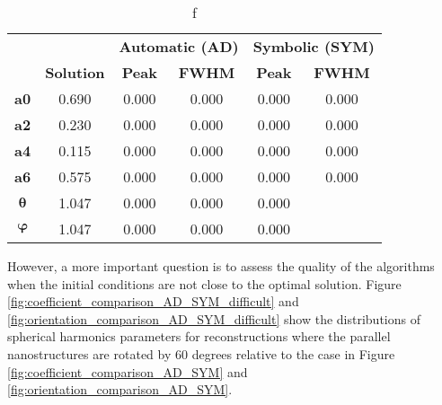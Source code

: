 \begin{table}
    \centering
    \caption{  f  }
    \label{tab:curve_fitting}
    \begin{tabular}{ c c c c c c }
        \hline %
        \textbf{}      &                   & \multicolumn{2}{c}{\textbf{Automatic (AD)}} & \multicolumn{2}{c}{\textbf{Symbolic (SYM)}}                                 \\
        \textbf{}      & \textbf{Solution} & \textbf{Peak}                               & \textbf{FWHM}                               & \textbf{Peak} & \textbf{FWHM} \\
        \hline %
        \textbf{a0}    & 0.690             & 0.000                                       & 0.000                                       & 0.000         & 0.000         \\
        \textbf{a2}    & 0.230             & 0.000                                       & 0.000                                       & 0.000         & 0.000         \\
        \textbf{a4}    & 0.115             & 0.000                                       & 0.000                                       & 0.000         & 0.000         \\
        \textbf{a6}    & 0.575             & 0.000                                       & 0.000                                       & 0.000         & 0.000         \\
        $\bm{\theta}$  & 1.047             & 0.000                                       & 0.000                                       & 0.000                         \\
        $\bm{\varphi}$ & 1.047             & 0.000                                       & 0.000                                       & 0.000                         \\
        \hline %
    \end{tabular}
\end{table}

However, a more important question is to assess the quality of the algorithms when the initial conditions are not close to the optimal solution.
Figure \ref{fig:coefficient_comparison_AD_SYM_difficult} and \ref{fig:orientation_comparison_AD_SYM_difficult} show the distributions of spherical harmonics parameters for reconstructions
where the parallel nanostructures are rotated by 60 degrees relative to the case in Figure \ref{fig:coefficient_comparison_AD_SYM} and \ref{fig:orientation_comparison_AD_SYM}.

